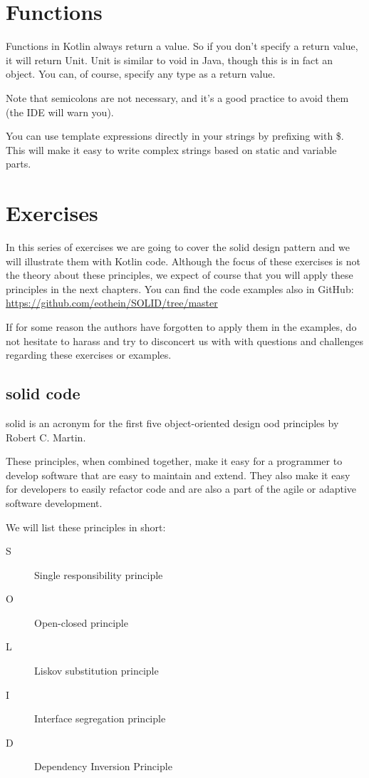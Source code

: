 \section{Functions}
Functions in Kotlin always return a value.
So if you don’t specify a return value, it will return Unit.
Unit is similar to void in Java, though this is in fact an object.
You can, of course, specify any type as a return value.

Note that semicolons are not  necessary, and it’s a good practice to avoid them (the IDE will warn you).

You can use template expressions directly in your strings by prefixing with \$.
This will make it easy to write complex strings based on static and variable parts.

\section{Exercises }
In this series of exercises we are going to cover the \gls{solid} design pattern and we will illustrate them with Kotlin code.
Although the focus of these exercises is not the theory about these principles, we expect of course that you will apply these principles in the next chapters.
You can find the code examples also in GitHub: \url{https://github.com/eothein/SOLID/tree/master}

If for some reason the authors  have forgotten to apply them in the examples, do not hesitate to  harass and try to disconcert us with with questions and challenges regarding these exercises or examples.


\subsection{\gls{solid} code}
\gls{solid} is an acronym for the first five object-oriented design \gls{ood} principles by Robert C. Martin.

These principles, when combined together, make it easy for a programmer to develop software that are easy to maintain and extend.
They also make it easy for developers to easily refactor code and are also a part of the agile or adaptive software development.

We will list these principles in short:

\begin{description}
	\item[S] Single responsibility principle
	\item[O] Open-closed principle
	\item[L] Liskov substitution principle
	\item[I] Interface segregation principle
	\item[D] Dependency Inversion Principle
\end{description}

